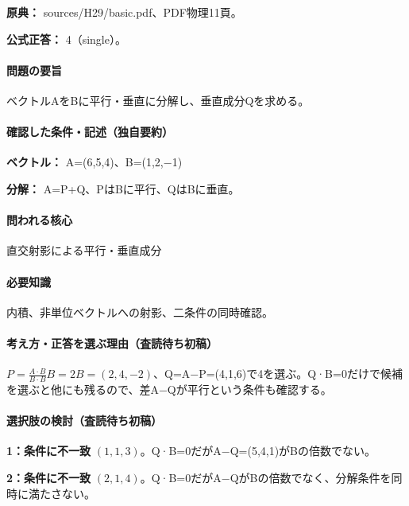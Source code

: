 \noindent\textbf{原典：} sources/H29/basic.pdf、PDF物理11頁。

\textbf{公式正答：} 4（single）。

\paragraph{問題の要旨} ベクトルAをBに平行・垂直に分解し、垂直成分Qを求める。

\paragraph{確認した条件・記述（独自要約）}\mbox{}\par

\noindent\textbf{ベクトル：} A=\allowbreak{}(6,5,4)、B=\allowbreak{}(1,2,−1)\par

\noindent\textbf{分解：} A=\allowbreak{}P+Q、PはBに平行、QはBに垂直。\par

\paragraph{問われる核心} 直交射影による平行・垂直成分

\paragraph{必要知識} 内積、非単位ベクトルへの射影、二条件の同時確認。

\paragraph{考え方・正答を選ぶ理由（査読待ち初稿）} \(P=\frac{A\cdot B}{B\cdot B}B=2B=(2,4,-2)\)、Q=\allowbreak{}A−P=\allowbreak{}(4,1,6)で4を選ぶ。Q·B=\allowbreak{}0だけで候補を選ぶと他にも残るので、差A−Qが平行という条件も確認する。

\paragraph{選択肢の検討（査読待ち初稿）}\mbox{}\par

\noindent\textbf{1：条件に不一致} \((1,1,3)\)。Q·B=\allowbreak{}0だがA−Q=\allowbreak{}(5,4,1)がBの倍数でない。\par

\noindent\textbf{2：条件に不一致} \((2,1,4)\)。Q·B=\allowbreak{}0だがA−QがBの倍数でなく、分解条件を同時に満たさない。\par

